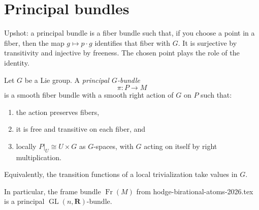 \section{Principal bundles}
\label{section-principal-bundles}

Upshot:
a principal bundle is a fiber bundle such
that, if you choose a point in a fiber,
then the map $g \mapsto p\cdot g$
identifies that fiber with $G$.
It is surjective by transitivity and
injective by freeness.
The chosen point plays the role of the
identity.

\begin{definition}
\label{definition-principal-bundle}
Let $G$ be a Lie group.
A {\it principal $G$-bundle}
\[
\pi:P\to M
\]
is a smooth fiber bundle with a smooth
right action of $G$ on $P$ such that:
\begin{enumerate}
\item the action preserves fibers,
\item it is free and transitive on each
fiber, and
\item locally $P|_U \cong U\times G$
as $G$-spaces,
with $G$ acting on itself by right
multiplication.
\end{enumerate}
\end{definition}

Equivalently,
the transition functions of a local
trivialization take values in $G$.

In particular,
the frame bundle $\operatorname{Fr}(M)$
from
hodge-birational-atoms-2026.tex
is a principal
\(\operatorname{GL}(n,\mathbf R)\)-bundle.


